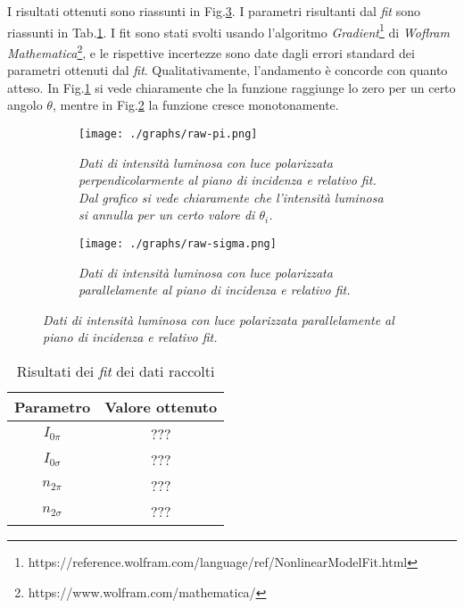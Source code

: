   I risultati ottenuti sono riassunti in Fig.\ref{fig:dati-raw}.
  I parametri risultanti dal \emph{fit} sono riassunti in Tab.\ref{tab:risultati-fit}.
  I fit sono stati svolti usando l'algoritmo \emph{Gradient}\footnote{https://reference.wolfram.com/language/ref/NonlinearModelFit.html} di \emph{Woflram Mathematica}\footnote{https://www.wolfram.com/mathematica/}, e le rispettive incertezze %
  sono date dagli errori standard dei parametri ottenuti dal \emph{fit}.                                          %
  Qualitativamente, l'andamento è concorde con quanto atteso. In Fig.\ref{fig:raw-pi}
  si vede chiaramente che la funzione raggiunge lo zero per un certo angolo $\theta$,
  mentre in Fig.\ref{fig:raw-sigma} la funzione cresce monotonamente.
  \begin{figure}[H]
    \centering
    \caption{Dati raccolti}
    \begin{subfigure}[t]{.4\textwidth}
      \texttt{[image: ./graphs/raw-pi.png]}
      \caption{
        \emph{
          Dati di intensità luminosa con luce polarizzata perpendicolarmente al
          piano di incidenza e relativo fit. Dal grafico si vede chiaramente che
          l'intensità luminosa si annulla per un certo valore di $\theta_i$.
        }
      }
      \label{fig:raw-pi}
    \end{subfigure}
    \hspace{20mm}
    \begin{subfigure}[t]{.4\textwidth}
      \texttt{[image: ./graphs/raw-sigma.png]}
      \caption{
        \emph{
          Dati di intensità luminosa con luce polarizzata parallelamente al
          piano di incidenza e relativo fit.
        }
      }
      \label{fig:raw-sigma}
    \end{subfigure}
    \label{fig:dati-raw}
  \end{figure}
  \begin{table}[ht]
    \centering
    \caption{Risultati dei \emph{fit} dei dati raccolti}
    \begin{tabular}[t]{cc}
      \toprule
      Parametro &Valore ottenuto\\
      \midrule
      $I_{0\pi}$    &??? \\ %
      $I_{0\sigma}$ &??? \\ %
      $n_{2\pi}$ &??? \\ %
      $n_{2\sigma}$ &??? \\ %
      \bottomrule
    \end{tabular}\label{tab:risultati-fit}
  \end{table}
